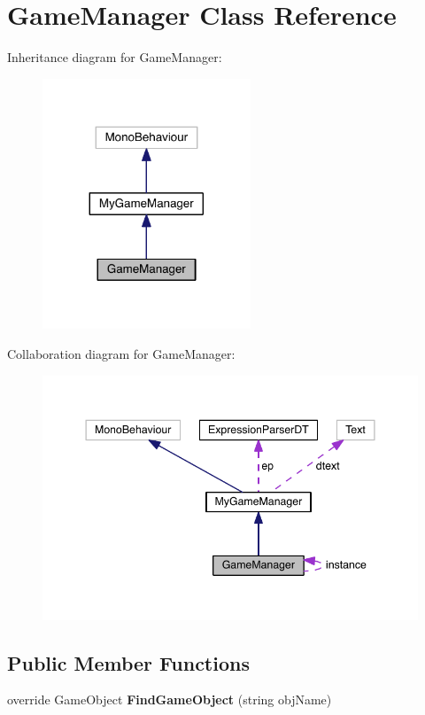\hypertarget{class_game_manager}{}\section{Game\+Manager Class Reference}
\label{class_game_manager}


Inheritance diagram for Game\+Manager\+:\nopagebreak
\begin{figure}[H]
\begin{center}
\leavevmode
\includegraphics[width=176pt]{class_game_manager__inherit__graph}
\end{center}
\end{figure}


Collaboration diagram for Game\+Manager\+:\nopagebreak
\begin{figure}[H]
\begin{center}
\leavevmode
\includegraphics[width=344pt]{class_game_manager__coll__graph}
\end{center}
\end{figure}
\subsection*{Public Member Functions}
\begin{DoxyCompactItemize}
\item 
override Game\+Object {\bfseries Find\+Game\+Object} (string obj\+Name)\hypertarget{class_game_manager_a3423fc3d472a1fe8d5531d30c286038f}{}\label{class_game_manager_a3423fc3d472a1fe8d5531d30c286038f}

\end{DoxyCompactItemize}

